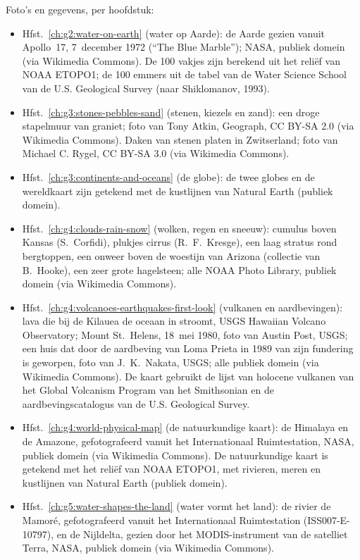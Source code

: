 \bigskip
\noindent Foto's en gegevens, per hoofdstuk:
\begin{itemize}\small
  \item Hfst.~\ref{ch:g2:water-on-earth} (water op Aarde): de Aarde gezien vanuit Apollo~17, 7~december 1972 (``The Blue Marble''); NASA, publiek domein (via Wikimedia Commons). De 100 vakjes zijn berekend uit het reliëf van NOAA ETOPO1; de 100 emmers uit de tabel van de Water Science School van de U.S. Geological Survey (naar Shiklomanov, 1993).
  \item Hfst.~\ref{ch:g3:stones-pebbles-sand} (stenen, kiezels en zand): een droge stapelmuur van graniet; foto van Tony Atkin, Geograph, CC BY-SA 2.0 (via Wikimedia Commons). Daken van stenen platen in Zwitserland; foto van Michael C. Rygel, CC BY-SA 3.0 (via Wikimedia Commons).
  \item Hfst.~\ref{ch:g3:continents-and-oceans} (de globe): de twee globes en de wereldkaart zijn getekend met de kustlijnen van Natural Earth (publiek domein).
  \item Hfst.~\ref{ch:g4:clouds-rain-snow} (wolken, regen en sneeuw): cumulus boven Kansas (S.~Corfidi), plukjes cirrus (R.~F.~Kresge), een laag stratus rond bergtoppen, een onweer boven de woestijn van Arizona (collectie van B.~Hooke), een zeer grote hagelsteen; alle NOAA Photo Library, publiek domein (via Wikimedia Commons).
  \item Hfst.~\ref{ch:g4:volcanoes-earthquakes-first-look} (vulkanen en aardbevingen): lava die bij de Kilauea de oceaan in stroomt, USGS Hawaiian Volcano Observatory; Mount St.~Helens, 18~mei 1980, foto van Austin Post, USGS; een huis dat door de aardbeving van Loma Prieta in 1989 van zijn fundering is geworpen, foto van J.~K.~Nakata, USGS; alle publiek domein (via Wikimedia Commons). De kaart gebruikt de lijst van holocene vulkanen van het Global Volcanism Program van het Smithsonian en de aardbevingscatalogus van de U.S. Geological Survey.
  \item Hfst.~\ref{ch:g4:world-physical-map} (de natuurkundige kaart): de Himalaya en de Amazone, gefotografeerd vanuit het Internationaal Ruimtestation, NASA, publiek domein (via Wikimedia Commons). De natuurkundige kaart is getekend met het reliëf van NOAA ETOPO1, met rivieren, meren en kustlijnen van Natural Earth (publiek domein).
  \item Hfst.~\ref{ch:g5:water-shapes-the-land} (water vormt het land): de rivier de Mamoré, gefotografeerd vanuit het Internationaal Ruimtestation (ISS007-E-10797), en de Nijldelta, gezien door het MODIS-instrument van de satelliet Terra, NASA, publiek domein (via Wikimedia Commons).

\end{itemize}
